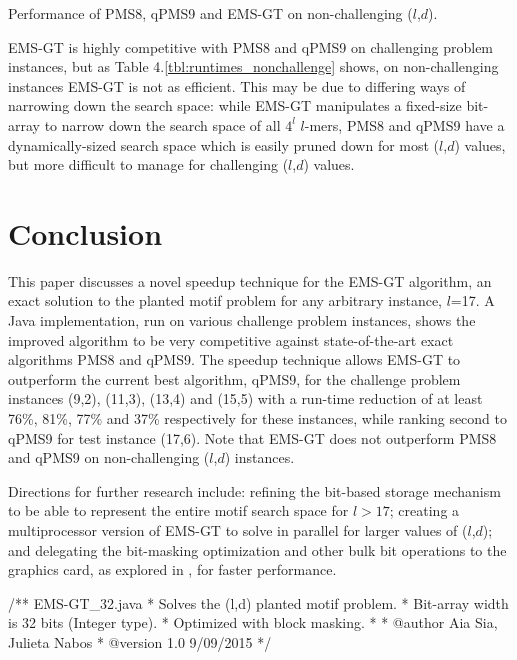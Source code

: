 \documentclass[oneside,12pt]{DISCSthesis}
\begin{document}
{\begin{table}[ht]
			\caption{\small Performance of PMS8, qPMS9 and EMS-GT on non-challenging ($l$,$d$).}
			\end{table}

		EMS-GT is highly competitive with PMS8 and qPMS9 on challenging problem instances, but as Table 4.\ref{tbl:runtimes_nonchallenge} shows, on non-challenging instances EMS-GT is not as efficient. This may be due to differing ways of narrowing down the search space: while EMS-GT manipulates a fixed-size bit-array to narrow down the search space of all $4^l$ $l$-mers, PMS8 and qPMS9 have a dynamically-sized search space which is easily pruned down for most ($l$,$d$) values, but more difficult to manage for challenging ($l$,$d$) values.

\chapter{Conclusion}
	This paper discusses a novel speedup technique for the EMS-GT algorithm, an exact solution to the planted motif problem for any arbitrary instance, $l$=17. A Java implementation, run on various challenge problem instances, shows the improved algorithm to be very competitive against state-of-the-art exact algorithms PMS8 and qPMS9. The speedup technique allows EMS-GT to outperform the current best algorithm, qPMS9, for the challenge problem instances (9,2), (11,3), (13,4) and (15,5) with a run-time reduction of at least 76\%, 81\%, 77\% and 37\% respectively for these instances, while ranking second to qPMS9 for test instance (17,6). Note that EMS-GT does not outperform PMS8 and qPMS9 on non-challenging ($l$,$d$) instances.

	Directions for further research include: refining the bit-based storage mechanism to be able to represent the entire motif search space for $l > 17$; creating a multiprocessor version of EMS-GT to solve in parallel for larger values of ($l$,$d$); and delegating the bit-masking optimization and other bulk bit operations to the graphics card, as explored in \cite{dasari2010efficient}, for faster performance.

\BackMatter




%


\begin{footnotesize}
\begin{verbatimtab}[2]
/** EMS-GT_32.java
  * Solves the (l,d) planted motif problem.
  * Bit-array width is 32 bits (Integer type).
  * Optimized with block masking.
  *
  * @author Aia Sia, Julieta Nabos
  * @version 1.0 9/09/2015
  */


\end{verbatimtab}
\end{footnotesize}}
\end{document}
